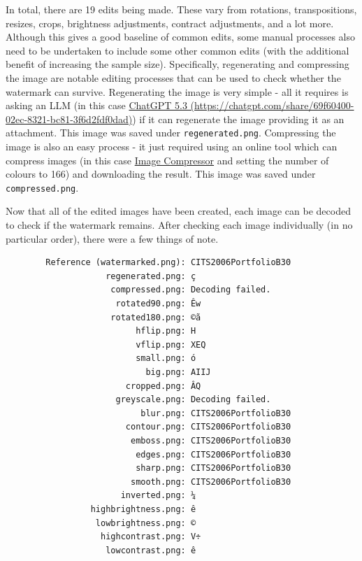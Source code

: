 \documentclass[titlepage]{article}
\begin{document}
        In total, there are 19 edits being made. These vary from rotations,
        transpositions, resizes, crops, brightness adjustments, contract
        adjustments, and a lot more. Although this gives a good baseline of
        common edits, some manual processes also need to be undertaken to
        include some other common edits (with the additional benefit of
        increasing the sample size). Specifically, regenerating and compressing
        the image are notable editing processes that can be used to check
        whether the watermark can survive. Regenerating the image is very simple
        - all it requires is asking an LLM (in this case
        \href{https://chatgpt.com/share/69f60400-02ec-8321-bc81-3f6d2fdf0dad}{ChatGPT
        5.3 (https://chatgpt.com/share/69f60400-02ec-8321-bc81-3f6d2fdf0dad)}) if it can regenerate the image providing it as an attachment. This
        image was saved under \texttt{regenerated.png}. Compressing the image is
        also an easy process - it just required using an online tool which can
        compress images (in this case \href{https://imagecompressor.com/}{Image
        Compressor} and setting the number of colours to 166) and downloading
        the result. This image was saved under \texttt{compressed.png}.

        \vspace{0.5em}

        Now that all of the edited images have been created, each image can be
        decoded to check if the watermark remains. After checking each image
        individually (in no particular order), there were a few things of note.

        \begin{verbatim}
        Reference (watermarked.png): CITS2006PortfolioB30
                    regenerated.png: ç
                     compressed.png: Decoding failed.
                      rotated90.png: Êw
                     rotated180.png: ©ã
                          hflip.png: H
                          vflip.png: XEQ
                          small.png: ó
                            big.png: AIIJ
                        cropped.png: ÂQ
                      greyscale.png: Decoding failed.
                           blur.png: CITS2006PortfolioB30
                        contour.png: CITS2006PortfolioB30
                         emboss.png: CITS2006PortfolioB30
                          edges.png: CITS2006PortfolioB30
                          sharp.png: CITS2006PortfolioB30
                         smooth.png: CITS2006PortfolioB30
                       inverted.png: ¼
                 highbrightness.png: ê
                  lowbrightness.png: ©
                   highcontrast.png: V÷
                    lowcontrast.png: ê
        \end{verbatim}
\end{document}
